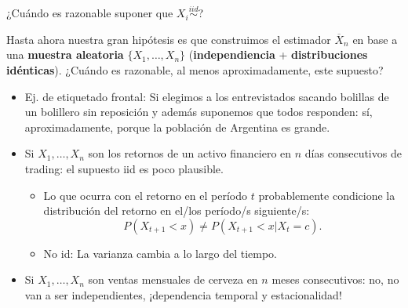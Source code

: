 \documentclass{beamer}
\theoremstyle{definition}
\begin{document}
\begin{frame}{\color{rosee}¿Cuándo es razonable suponer que $X_i\stackrel{iid}{\sim}$?} \small 

  Hasta ahora nuestra gran hip\'otesis es que construimos el estimador $\overline{X}_n$ en base a una 
  \textbf{muestra aleatoria} $\{X_1,\dots,X_n\}$ (\textbf{independiencia} +
  \textbf{distribuciones idénticas}). ¿Cuándo es razonable, al menos  aproximadamente, este supuesto?\medskip
  \begin{itemize}
  \item Ej. de etiquetado frontal: Si elegimos a los entrevistados sacando bolillas de un bolillero sin
    reposici\'on y además suponemos que todos responden: s\'i, aproximadamente, porque la poblaci\'on de
    Argentina es grande.\medskip
  \item Si $X_{1},\dots, X_{n}$ son los retornos de un activo financiero en $n$ d\'ias consecutivos de trading: el supuesto iid es poco plausible.
  \begin{itemize}
      \item Lo que ocurra con el retorno en el período $t$ probablemente condicione la distribución del retorno en el/los período/s siguiente/s:
      $$P(X_{t+1}<x) \neq P(X_{t+1}<x|X_{t}=c).$$
      \item No id: La varianza cambia a lo largo del tiempo. \medskip
  \end{itemize}
  \item Si $X_{1},\dots, X_{n}$ son ventas mensuales de cerveza en $n$ meses consecutivos: no, no van a ser independientes, ¡dependencia temporal y estacionalidad!
  \end{itemize}
\end{frame}



%  
\end{document}
